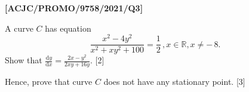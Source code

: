 \item \textbf{{[}ACJC/PROMO/9758/2021/Q3{]}}

A curve $C$ has equation 
\[
\frac{x^{2}-4y^{2}}{x^{2}+xy^{2}+100}=\frac{1}{2}\,,x\in\mathbb{R},x\ne-\,8.
\]
Show that $\frac{\text{d}y}{\text{d}x}=\frac{2x-y^{2}}{2xy+16y}$.
\hfill{}{[}2{]}

Hence, prove that curve $C$ does not have any stationary point. \hfill{}{[}3{]}